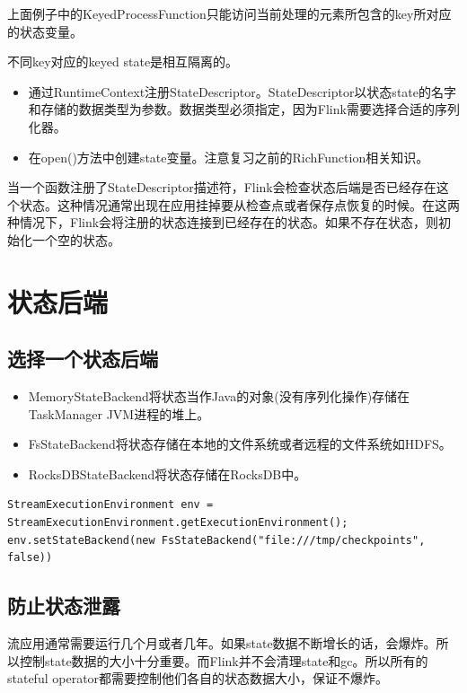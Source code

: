 \documentclass[cn,11pt,chinese]{elegantbook}
\begin{document}
上面例子中的KeyedProcessFunction只能访问当前处理的元素所包含的key所对应的状态变量。

\begin{note}
    不同key对应的keyed state是相互隔离的。
\end{note}

\begin{itemize}
    \item 通过RuntimeContext注册StateDescriptor。StateDescriptor以状态state的名字和存储的数据类型为参数。数据类型必须指定，因为Flink需要选择合适的序列化器。
    \item 在open()方法中创建state变量。注意复习之前的RichFunction相关知识。
\end{itemize}

当一个函数注册了StateDescriptor描述符，Flink会检查状态后端是否已经存在这个状态。这种情况通常出现在应用挂掉要从检查点或者保存点恢复的时候。在这两种情况下，Flink会将注册的状态连接到已经存在的状态。如果不存在状态，则初始化一个空的状态。

\section{状态后端}

\subsection{选择一个状态后端}

\begin{itemize}
    \item MemoryStateBackend将状态当作Java的对象(没有序列化操作)存储在TaskManager JVM进程的堆上。
    \item FsStateBackend将状态存储在本地的文件系统或者远程的文件系统如HDFS。
    \item RocksDBStateBackend将状态存储在RocksDB中。
\end{itemize}

\begin{verbatim}
StreamExecutionEnvironment env = StreamExecutionEnvironment.getExecutionEnvironment();
env.setStateBackend(new FsStateBackend("file:///tmp/checkpoints", false))
\end{verbatim}

\subsection{防止状态泄露}

流应用通常需要运行几个月或者几年。如果state数据不断增长的话，会爆炸。所以控制state数据的大小十分重要。而Flink并不会清理state和gc。所以所有的stateful operator都需要控制他们各自的状态数据大小，保证不爆炸。
\end{document}
